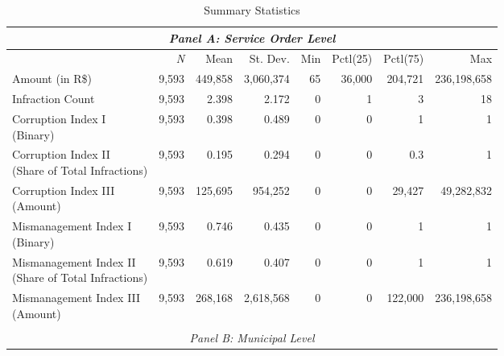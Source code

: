 \documentclass[11pt]{article}
\newcommand\T{\rule{0pt}{2.6ex}}       %
\newcommand\B{\rule[-1.2ex]{0pt}{0pt}} %
\begin{document}
\begin{table}[!htbp]
  \caption{\label{descriptivestatistics}Summary Statistics}
  \centering
  \small
  \begin{tabular}{lrrrrrrr}
  \hline

  \hline
  \multicolumn{8}{c}{\emph{Panel A: Service Order Level}} \T \B \\
  \hline
  & \multicolumn{1}{r}{\emph{N}} & \multicolumn{1}{r}{Mean} & \multicolumn{1}{r}{St. Dev.} & \multicolumn{1}{r}{Min} & \multicolumn{1}{r}{Pctl(25)} & \multicolumn{1}{r}{Pctl(75)} & \multicolumn{1}{r}{Max} \T \B \\
  \hline
  Amount (in R\$)                                                                     & 9,593 & 449,858 & 3,060,374 & 65 & 36,000 & 204,721 & 236,198,658 \T \B \\
  Infraction Count                                                                    & 9,593 & 2.398   & 2.172     & 0  & 1      & 3       & 18          \T \B \\
  \makecell[cl]{Corruption Index I \\ {\footnotesize(Binary)}}                        & 9,593 & 0.398   & 0.489     & 0  & 0      & 1       & 1           \T \B \\
  \makecell[cl]{Corruption Index II \\ {\footnotesize(Share of Total Infractions)}}   & 9,593 & 0.195   & 0.294     & 0  & 0      & 0.3     & 1           \T \B \\
  \makecell[cl]{Corruption Index III \\ {\footnotesize(Amount)}}                      & 9,593 & 125,695 & 954,252   & 0  & 0      & 29,427  & 49,282,832  \T \B \\
  \makecell[cl]{Mismanagement Index I \\ {\footnotesize(Binary)}}                     & 9,593 & 0.746   & 0.435     & 0  & 0      & 1       & 1           \T \B \\
  \makecell[cl]{Mismanagement Index II \\ {\footnotesize(Share of Total Infractions)}}& 9,593 & 0.619   & 0.407     & 0  & 0      & 1       & 1           \T \B \\
  \makecell[cl]{Mismanagement Index III \\ {\footnotesize(Amount)}}                   & 9,593 & 268,168 & 2,618,568 & 0  & 0      & 122,000 & 236,198,658 \T \B \\
  \hline
  \multicolumn{8}{c}{}\\
  \multicolumn{8}{c}{\emph{Panel B: Municipal Level}} \T \B \\

\end{tabular}
\end{table}
\end{document}
